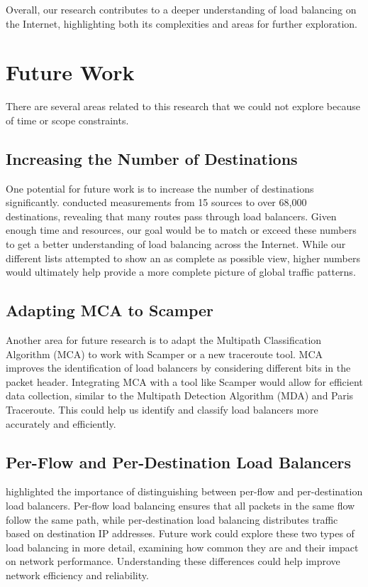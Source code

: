 \documentclass[12pt]{cwru_thesis}
\begin{document}
Overall, our research contributes to a deeper understanding of load balancing on the Internet, highlighting both its complexities and areas for further exploration.

\chapter{Future Work}

There are several areas related to this research that we could not explore because of time or scope constraints. 

\section*{Increasing the Number of Destinations}

One potential for future work is to increase the number of destinations significantly. \textbf{\cite{augustin2010measuring} }conducted measurements from 15 sources to over 68,000 destinations, revealing that many routes pass through load balancers. Given enough time and resources, our goal would be to match or exceed these numbers to get a better understanding of load balancing across the Internet. While our different lists attempted to show an as complete as possible view, higher numbers would ultimately help provide a more complete picture of global traffic patterns.

\section*{Adapting MCA to Scamper}

Another area for future research is to adapt the Multipath Classification Algorithm (MCA) to work with Scamper or a new traceroute tool. MCA improves the identification of load balancers by considering different bits in the packet header. Integrating MCA with a tool like Scamper would allow for efficient data collection, similar to the Multipath Detection Algorithm (MDA) and Paris Traceroute. This could help us identify and classify load balancers more accurately and efficiently.

\section*{Per-Flow and Per-Destination Load Balancers}

\textbf{\cite{4261334}} highlighted the importance of distinguishing between per-flow and per-destination load balancers. Per-flow load balancing ensures that all packets in the same flow follow the same path, while per-destination load balancing distributes traffic based on destination IP addresses. Future work could explore these two types of load balancing in more detail, examining how common they are and their impact on network performance. Understanding these differences could help improve network efficiency and reliability.
\end{document}
